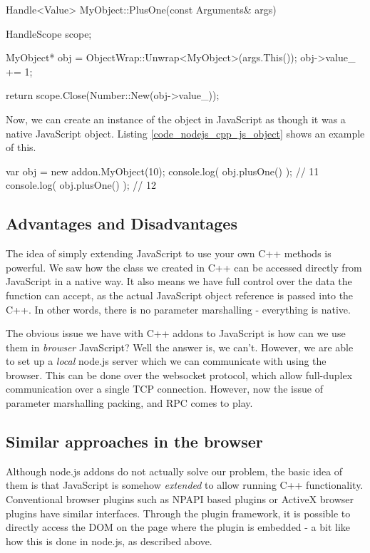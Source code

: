 \begin{code}
Handle<Value> MyObject::PlusOne(const Arguments& args) {
  HandleScope scope;

  MyObject* obj = ObjectWrap::Unwrap<MyObject>(args.This());
  obj->value_ += 1;

  return scope.Close(Number::New(obj->value_));
}
\end{code}

Now, we can create an instance of the object in JavaScript as though it was a native JavaScript object. Listing \ref{code_nodejs_cpp_js_object} shows an example of this.

\begin{code}
var obj = new addon.MyObject(10);
console.log( obj.plusOne() ); // 11
console.log( obj.plusOne() ); // 12
\end{code}

\subsection{Advantages and Disadvantages} %
\label{sub:nodejs_cpp_advantages_and_disadvantages}
The idea of simply extending JavaScript to use your own C++ methods is powerful. We saw how the class we created in C++ can be accessed directly from JavaScript in a native way. It also means we have full control over the data the function can accept, as the actual JavaScript object reference is passed into the C++. In other words, there is no parameter marshalling - everything is native.

The obvious issue we have with C++ addons to JavaScript is how can we use them in \emph{browser} JavaScript? Well the answer is, we can't. However, we are able to set up a \emph{local} node.js server which we can communicate with using the browser. This can be done over the websocket protocol, which allow full-duplex communication over a single TCP connection. However, now the issue of parameter marshalling packing, and RPC comes to play. 


\subsection{Similar approaches in the browser} %
\label{sub:cpp_js_similar_approaches_in_the_browser}

Although node.js addons do not actually solve our problem, the basic idea of them is that JavaScript is somehow \emph{extended} to allow running C++ functionality. Conventional browser plugins such as NPAPI based plugins or ActiveX browser plugins have similar interfaces. Through the plugin framework, it is possible to directly access the DOM on the page where the plugin is embedded - a bit like how this is done in node.js, as described above. 

